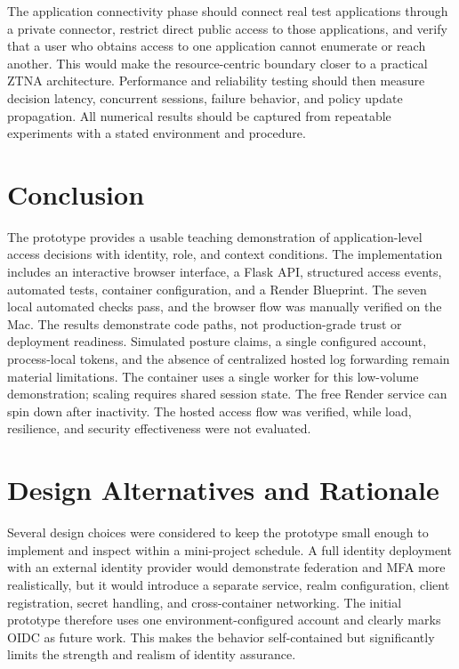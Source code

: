 The application connectivity phase should connect real test applications through a private connector, restrict direct public access to those applications, and verify that a user who obtains access to one application cannot enumerate or reach another. This would make the resource-centric boundary closer to a practical ZTNA architecture. Performance and reliability testing should then measure decision latency, concurrent sessions, failure behavior, and policy update propagation. All numerical results should be captured from repeatable experiments with a stated environment and procedure.

\section{Conclusion}
The prototype provides a usable teaching demonstration of application-level access decisions with identity, role, and context conditions. The implementation includes an interactive browser interface, a Flask API, structured access events, automated tests, container configuration, and a Render Blueprint. The seven local automated checks pass, and the browser flow was manually verified on the Mac. The results demonstrate code paths, not production-grade trust or deployment readiness. Simulated posture claims, a single configured account, process-local tokens, and the absence of centralized hosted log forwarding remain material limitations. The container uses a single worker for this low-volume demonstration; scaling requires shared session state. The free Render service can spin down after inactivity. The hosted access flow was verified, while load, resilience, and security effectiveness were not evaluated.


\section{Design Alternatives and Rationale}
Several design choices were considered to keep the prototype small enough to implement and inspect within a mini-project schedule. A full identity deployment with an external identity provider would demonstrate federation and MFA more realistically, but it would introduce a separate service, realm configuration, client registration, secret handling, and cross-container networking. The initial prototype therefore uses one environment-configured account and clearly marks OIDC as future work. This makes the behavior self-contained but significantly limits the strength and realism of identity assurance.

